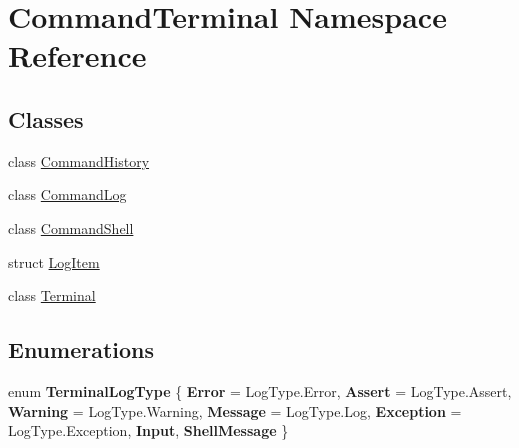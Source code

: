 \hypertarget{namespace_command_terminal}{}\section{Command\+Terminal Namespace Reference}
\label{namespace_command_terminal}
\subsection*{Classes}
\begin{DoxyCompactItemize}
\item 
class \mbox{\hyperlink{class_command_terminal_1_1_command_history}{Command\+History}}
\item 
class \mbox{\hyperlink{class_command_terminal_1_1_command_log}{Command\+Log}}
\item 
class \mbox{\hyperlink{class_command_terminal_1_1_command_shell}{Command\+Shell}}
\item 
struct \mbox{\hyperlink{struct_command_terminal_1_1_log_item}{Log\+Item}}
\item 
class \mbox{\hyperlink{class_command_terminal_1_1_terminal}{Terminal}}
\end{DoxyCompactItemize}
\subsection*{Enumerations}
\begin{DoxyCompactItemize}
\item 
\mbox{\label{namespace_command_terminal_a2d770625a48fbc7fef1b847bad584a62}} 
enum {\bfseries Terminal\+Log\+Type} \{ \newline
{\bfseries Error} = Log\+Type.\+Error, 
{\bfseries Assert} = Log\+Type.\+Assert, 
{\bfseries Warning} = Log\+Type.\+Warning, 
{\bfseries Message} = Log\+Type.\+Log, 
\newline
{\bfseries Exception} = Log\+Type.\+Exception, 
{\bfseries Input}, 
{\bfseries Shell\+Message}
 \}
\end{DoxyCompactItemize}
